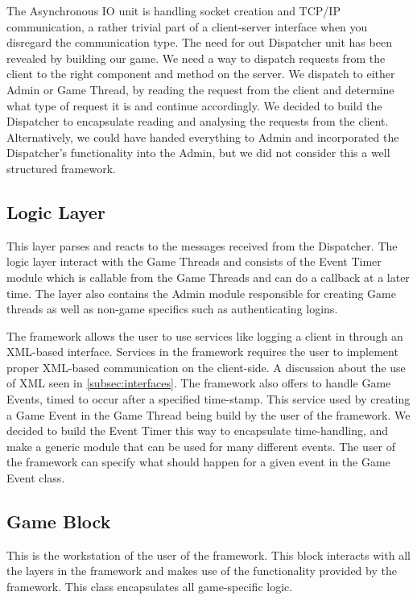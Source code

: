 The Asynchronous IO unit is handling socket creation and TCP/IP communication, a rather trivial part of a client-server interface when you disregard the communication type. The need for out Dispatcher unit has been revealed by building our game. We need a way to dispatch requests from the client to the right component and method on the server. We dispatch to either Admin or Game Thread, by reading the request from the client and determine what type of request it is and continue accordingly. We decided to build the Dispatcher to encapsulate reading and analysing the requests from the client. Alternatively, we could have handed everything to Admin and incorporated the Dispatcher's functionality into the Admin, but we did not consider this a well structured framework.




\subsection{Logic Layer}
This layer parses and reacts to the messages received from the Dispatcher. The logic layer interact with the Game Threads and consists of the Event Timer module which is callable from the Game Threads and can do a callback at a later time. The layer also contains the Admin module responsible for creating Game threads as well as non-game specifics such as authenticating logins.

The framework allows the user to use services like logging a client in through an XML-based interface. Services in the framework requires the user to implement proper XML-based communication on the client-side. A discussion about the use of XML seen in \ref{subsec:interfaces}. The framework also offers to handle Game Events, timed to occur after a specified time-stamp. This service used by creating a Game Event in the Game Thread being build by the user of the framework. We decided to build the Event Timer this way to encapsulate time-handling, and make a generic module that can be used for many different events. The user of the framework can specify what should happen for a given event in the Game Event class.




\subsection{Game Block}
This is the workstation of the user of the framework. This block interacts with all the layers in the framework and makes use of the functionality provided by the framework. This class encapsulates all game-specific logic.

